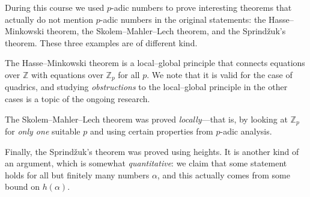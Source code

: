 \documentclass{article}
\newcommand{\ZZ}{\mathbb{Z}}
\theoremstyle{myplain}
\theoremstyle{mydefinition}
\begin{document}
During this course we used $p$-adic numbers to prove interesting theorems that
actually do not mention $p$-adic numbers in the original statements: the
Hasse--Minkowski theorem, the Skolem--Mahler--Lech theorem, and the
Sprind\v{z}uk's theorem. These three examples are of different kind.

The Hasse--Minkowski theorem is a local--global principle that connects
equations over $\ZZ$ with equations over $\ZZ_p$ for all $p$. We note that it is
valid for the case of quadrics, and studying \emph{obstructions} to the
local--global principle in the other cases is a topic of the ongoing research.

The Skolem--Mahler--Lech theorem was proved \emph{locally}---that is, by looking
at $\ZZ_p$ for \emph{only one} suitable $p$ and using certain properties from
$p$-adic analysis.

Finally, the Sprind\v{z}uk's theorem was proved using heights. It is another
kind of an argument, which is somewhat \emph{quantitative}: we claim that some
statement holds for all but finitely many numbers $\alpha$, and this actually
comes from some bound on $h (\alpha)$.
\end{document}
